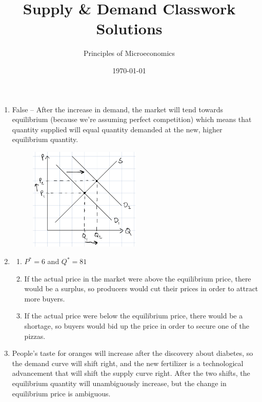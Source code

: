\documentclass{article}
\title{Supply \& Demand Classwork Solutions}
\author{Principles of Microeconomics}
\date{\today}
\begin{document}
\maketitle

\begin{enumerate}

\item False -- After the increase in demand, the market will tend towards equilibrium (because we're assuming perfect competition) which means that quantity supplied will equal quantity demanded at the new, higher equilibrium quantity.

 	\begin{figure}[h]
	\centering
	\includegraphics[width = 0.5\textwidth]{problem1}
	\end{figure}

\item

	\begin{enumerate}
	
	\item $P^* = 6$ and $Q^* = 81$
	
	\item If the actual price in the market were above the equilibrium price, there would be a surplus, so producers would cut their prices in order to attract more buyers.
	
	\item If the actual price were below the equilibrium price, there would be a shortage, so buyers would bid up the price in order to secure one of the pizzas. 
		
	\end{enumerate}

\newpage
	
\item People's taste for oranges will increase after the discovery about diabetes, so the demand curve will shift right, and the new fertilizer is a technological advancement that will shift the supply curve right. After the two shifts, the equilibrium quantity will unambiguously increase, but the change in equilibrium price is ambiguous.


\end{enumerate}
\end{document}
